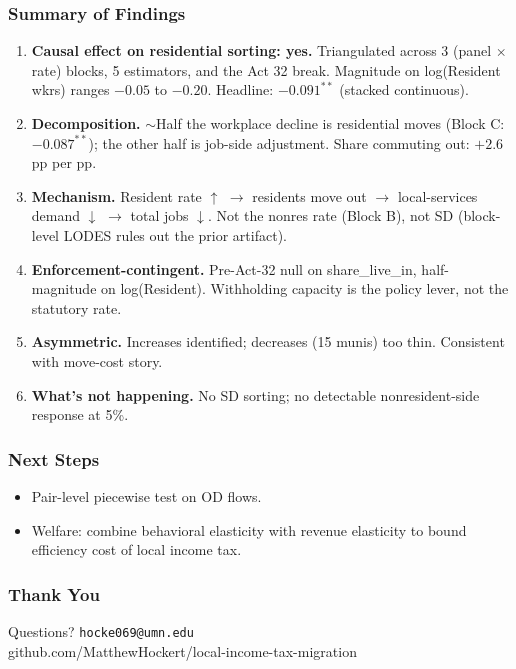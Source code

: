 \documentclass[xcolor = x11names, compress, aspectratio = 169]{beamer}
\renewcommand{\(}{\begin{columns}}
\renewcommand{\)}{\end{columns}}
\newcommand{\<}[1]{\begin{column}{#1}}
\renewcommand{\>}{\end{column}}
\begin{document}
\begin{frame}
\frametitle{Summary of Findings}
    \scriptsize
    \begin{enumerate}\setlength{\itemsep}{0.07cm}
        \item \textbf{Causal effect on residential sorting: yes.}
        Triangulated across 3 (panel $\times$ rate) blocks, 5 estimators,
        and the Act 32 break. Magnitude on log(Resident wkrs) ranges
        $-0.05$ to $-0.20$. Headline: $-0.091^{**}$ (stacked continuous).
        \item \textbf{Decomposition.} $\sim$Half the workplace decline
        is residential moves (Block C: $-0.087^{**}$); the other half is
        job-side adjustment. Share commuting out: $+2.6$pp per pp.
        \item \textbf{Mechanism.} Resident rate $\uparrow$ $\to$ residents
        move out $\to$ local-services demand $\downarrow$ $\to$ total jobs $\downarrow$.
        Not the nonres rate (Block B), not SD (block-level LODES rules
        out the prior artifact).
        \item \textbf{Enforcement-contingent.} Pre-Act-32 null on
        share\_live\_in, half-magnitude on log(Resident). Withholding
        capacity is the policy lever, not the statutory rate.
        \item \textbf{Asymmetric.} Increases identified; decreases (15 munis)
        too thin. Consistent with move-cost story.
        \item \textbf{What's not happening.} No SD sorting; no detectable
        nonresident-side response at 5\%.
    \end{enumerate}
\end{frame}

\begin{frame}
\frametitle{Next Steps}
    \begin{itemize}\setlength{\itemsep}{0.15cm}
        \item Pair-level piecewise test on OD flows. 
        \item Welfare: combine behavioral elasticity with revenue
        elasticity to bound efficiency cost of local income tax.
    \end{itemize}
\end{frame}

\begin{frame}
\frametitle{Thank You}
    \centering
    \vfill
    \Large Questions?
    \vfill
    \normalsize
    \texttt{hocke069@umn.edu} \\
    \small github.com/MatthewHockert/local-income-tax-migration
    \vfill
\end{frame}
\end{document}

